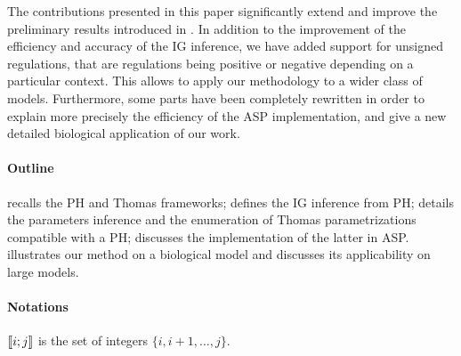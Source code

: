 The contributions presented in this paper significantly extend and improve the preliminary results
introduced in \cite{FPIMR12-CMSB}.
In addition to the improvement of the efficiency and accuracy of the IG inference, we have added support for
unsigned regulations, that are regulations being positive or negative depending on a particular
context.
This allows to apply our methodology to a wider class of models.
Furthermore, some parts have been completely rewritten in order to explain more precisely the efficiency of the ASP implementation,
and give a new detailed biological application of our work.

\paragraph{Outline}
 recalls the PH and Thomas frameworks;
 defines the IG inference from PH;
 details the parameters inference and the enumeration of Thomas parametrizations compatible with a PH;
 discusses the implementation of the latter in ASP.
 illustrates our method on a biological model
and discusses its applicability on large models.

\paragraph{Notations}
$\llbracket i ; j \rrbracket$ is the set of integers $\{ i, i+1, \dots, j \}$.
